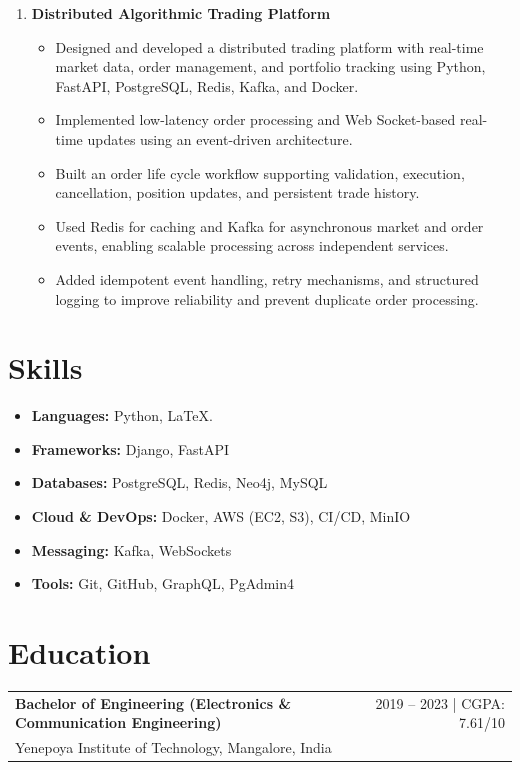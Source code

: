 \documentclass[11pt,a4paper]{article}
\begin{document}
\begin{enumerate}
    \item \textbf{Distributed Algorithmic Trading Platform}
    \begin{itemize}
        \item Designed and developed a distributed trading platform with real-time market data, order management, and portfolio tracking using Python, FastAPI, PostgreSQL, Redis, Kafka, and Docker.
        \item Implemented low-latency order processing and Web Socket-based real-time updates using an event-driven architecture.
        \item Built an order life cycle workflow supporting validation, execution, cancellation, position updates, and persistent trade history.
        \item Used Redis for caching and Kafka for asynchronous market and order events, enabling scalable processing across independent services.
        \item Added idempotent event handling, retry mechanisms, and structured logging to improve reliability and prevent duplicate order processing.
    \end{itemize}
\end{enumerate}

\section{\Large{Skills}}

\begin{itemize}
    \item \textbf{Languages:} Python, LaTeX.
    \item \textbf{Frameworks:} Django, FastAPI
    \item \textbf{Databases:} PostgreSQL, Redis, Neo4j, MySQL
    \item \textbf{Cloud \& DevOps:} Docker, AWS (EC2, S3), CI/CD, MinIO
    \item \textbf{Messaging:} Kafka, WebSockets
    \item \textbf{Tools:} Git, GitHub, GraphQL, PgAdmin4
\end{itemize}

\section{\Large{Education}}

\begin{tabularx}{\textwidth}{@{}X r@{}}
    \textbf{Bachelor of Engineering (Electronics \& Communication Engineering)} & 2019 -- 2023 | CGPA: 7.61/10 \\
    Yenepoya Institute of Technology, Mangalore, India & \\
\end{tabularx}
\end{document}

